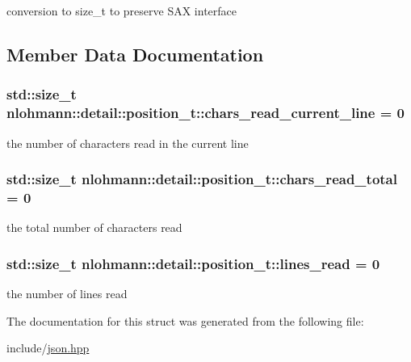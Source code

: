 conversion to size\+\_\+t to preserve S\+AX interface 



\subsection{Member Data Documentation}
\subsubsection[{\texorpdfstring{chars\+\_\+read\+\_\+current\+\_\+line}{chars_read_current_line}}]{\setlength{\rightskip}{0pt plus 5cm}std\+::size\+\_\+t nlohmann\+::detail\+::position\+\_\+t\+::chars\+\_\+read\+\_\+current\+\_\+line = 0}\hypertarget{structnlohmann_1_1detail_1_1position__t_a74df94563dd32102152ceb8c6d9041d8}{}\label{structnlohmann_1_1detail_1_1position__t_a74df94563dd32102152ceb8c6d9041d8}


the number of characters read in the current line 

\subsubsection[{\texorpdfstring{chars\+\_\+read\+\_\+total}{chars_read_total}}]{\setlength{\rightskip}{0pt plus 5cm}std\+::size\+\_\+t nlohmann\+::detail\+::position\+\_\+t\+::chars\+\_\+read\+\_\+total = 0}\hypertarget{structnlohmann_1_1detail_1_1position__t_a94cf85cd91d478c20ae143eba906ea1a}{}\label{structnlohmann_1_1detail_1_1position__t_a94cf85cd91d478c20ae143eba906ea1a}


the total number of characters read 

\subsubsection[{\texorpdfstring{lines\+\_\+read}{lines_read}}]{\setlength{\rightskip}{0pt plus 5cm}std\+::size\+\_\+t nlohmann\+::detail\+::position\+\_\+t\+::lines\+\_\+read = 0}\hypertarget{structnlohmann_1_1detail_1_1position__t_a4bbad8bc2c0d17c1b61c3ce729908b71}{}\label{structnlohmann_1_1detail_1_1position__t_a4bbad8bc2c0d17c1b61c3ce729908b71}


the number of lines read 



The documentation for this struct was generated from the following file\+:\begin{DoxyCompactItemize}
\item 
include/\hyperlink{json_8hpp}{json.\+hpp}\end{DoxyCompactItemize}
